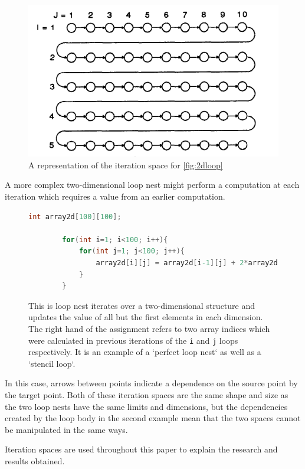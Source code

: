 \documentclass[a4paper,12pt,twoside]{report}
\begin{document}
\begin{figure}
    \includegraphics[scale=0.75]{iteration_space}
    \caption{A representation of the iteration space for \ref{fig:2dloop}}
    \label{fig:iteration_space}
\end{figure}

A more complex two-dimensional loop nest might perform a computation at each iteration which requires a value from an earlier
computation.

\begin{figure}
    \begin{lstlisting}[language=C]
        int array2d[100][100];

        for(int i=1; i<100; i++){
            for(int j=1; j<100; j++){
                array2d[i][j] = array2d[i-1][j] + 2*array2d[i][j-1];
            }
        }
    \end{lstlisting}
    \caption{
        This is loop nest iterates over a two-dimensional structure and updates the value of all but the first elements in each dimension.
        The right hand of the assignment refers to two array indices which were calculated in previous iterations of the \texttt{i} and \texttt{j} loops
        respectively. It is an example of a `perfect loop nest` as well as a `stencil loop`.
    }
    \label{fig:stencil}
\end{figure}

In this case, arrows between points indicate a dependence on the source point by the target point. Both of these iteration 
spaces are the same shape and size as the two loop nests have the same limits and dimensions, but the
dependencies created by the loop body in the second example mean that the two spaces cannot be manipulated in the same ways.

Iteration spaces are used throughout this paper to explain the research and results obtained.
\end{document}
